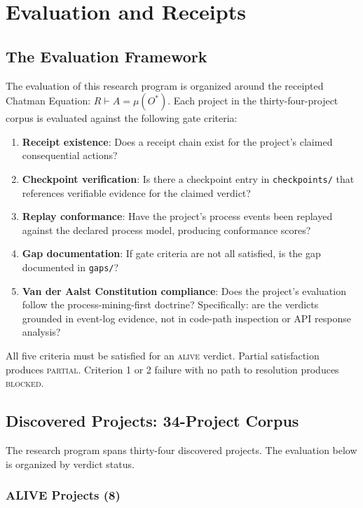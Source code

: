 \chapter{Evaluation and Receipts}
\label{chap:evaluation}

\section{The Evaluation Framework}

The evaluation of this research program is organized around the receipted Chatman Equation: $R \vdash A = \mu(O^{*})$. Each project in the thirty-four-project corpus is evaluated against the following gate criteria:

\begin{enumerate}
  \item \textbf{Receipt existence}: Does a receipt chain exist for the project's claimed consequential actions?
  \item \textbf{Checkpoint verification}: Is there a checkpoint entry in \texttt{checkpoints/} that references verifiable evidence for the claimed verdict?
  \item \textbf{Replay conformance}: Have the project's process events been replayed against the declared process model, producing conformance scores?
  \item \textbf{Gap documentation}: If gate criteria are not all satisfied, is the gap documented in \texttt{gaps/}?
  \item \textbf{Van der Aalst Constitution compliance}: Does the project's evaluation follow the process-mining-first doctrine? Specifically: are the verdicts grounded in event-log evidence, not in code-path inspection or API response analysis?
\end{enumerate}

All five criteria must be satisfied for an \textsc{alive} verdict. Partial satisfaction produces \textsc{partial}. Criterion 1 or 2 failure with no path to resolution produces \textsc{blocked}.

\section{Discovered Projects: 34-Project Corpus}

The research program spans thirty-four discovered projects. The evaluation below is organized by verdict status.

\subsection{ALIVE Projects (8)}

